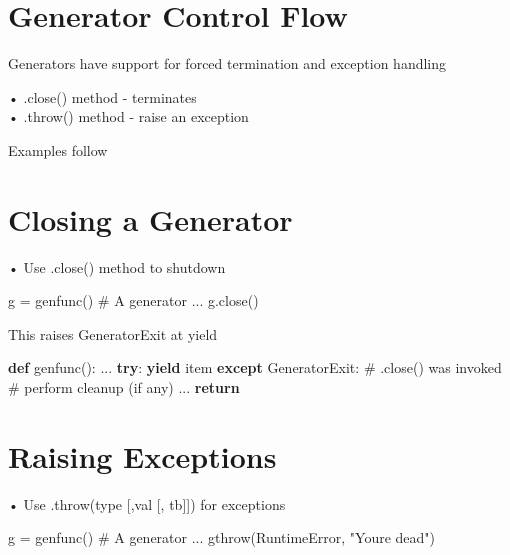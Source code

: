 \documentclass[
  letterpaper,
  DIV=11,
  numbers=noendperiod]{scrreprt}
\newenvironment{Shaded}{\begin{snugshade}}{\end{snugshade}}
\newcommand{\CommentTok}[1]{\textcolor[rgb]{0.37,0.37,0.37}{#1}}
\newcommand{\ConstantTok}[1]{\textcolor[rgb]{0.56,0.35,0.01}{#1}}
\newcommand{\ControlFlowTok}[1]{\textcolor[rgb]{0.00,0.23,0.31}{\textbf{#1}}}
\newcommand{\KeywordTok}[1]{\textcolor[rgb]{0.00,0.23,0.31}{\textbf{#1}}}
\newcommand{\NormalTok}[1]{\textcolor[rgb]{0.00,0.23,0.31}{#1}}
\newcommand{\OperatorTok}[1]{\textcolor[rgb]{0.37,0.37,0.37}{#1}}
\newcommand{\PreprocessorTok}[1]{\textcolor[rgb]{0.68,0.00,0.00}{#1}}
\newcommand{\StringTok}[1]{\textcolor[rgb]{0.13,0.47,0.30}{#1}}
\newcommand{\VariableTok}[1]{\textcolor[rgb]{0.07,0.07,0.07}{#1}}
\begin{document}
\chapter{Generator Control Flow}\label{generator-control-flow}

Generators have support for forced termination and exception handling

• .close() method - terminates\\
• .throw() method - raise an exception

Examples follow


\chapter{Closing a Generator}\label{closing-a-generator}

• Use .close() method to shutdown

\begin{Shaded}
\begin{Highlighting}[]
\NormalTok{g = genfunc() \# A generator  }
\NormalTok{...  }
\NormalTok{g.close() }
\end{Highlighting}
\end{Shaded}

This raises GeneratorExit at yield

\begin{Shaded}
\begin{Highlighting}[]
\KeywordTok{def}\NormalTok{ genfunc():}
\NormalTok{    ...}
    \ControlFlowTok{try}\NormalTok{:}
        \ControlFlowTok{yield}\NormalTok{ item}
\ControlFlowTok{except} \PreprocessorTok{GeneratorExit}\NormalTok{:}
    \CommentTok{\# .close() was invoked}
    \CommentTok{\# perform cleanup (if any)}
\NormalTok{    ...}
    \ControlFlowTok{return} 
\end{Highlighting}
\end{Shaded}


\chapter{Raising Exceptions}\label{raising-exceptions}

• Use .throw(type {[},val {[}, tb{]}{]}) for exceptions

\begin{Shaded}
\begin{Highlighting}[]
\VariableTok{g} \OperatorTok{=}\NormalTok{ genfunc}\OperatorTok{()} \OperatorTok{\#} \ConstantTok{A} \VariableTok{generator}  
\OperatorTok{...}  
\NormalTok{gthrow}\OperatorTok{(}\VariableTok{RuntimeError}\OperatorTok{,} \StringTok{"You\textquotesingle{}re dead"}\OperatorTok{)} 
\end{Highlighting}
\end{Shaded}
\end{document}
